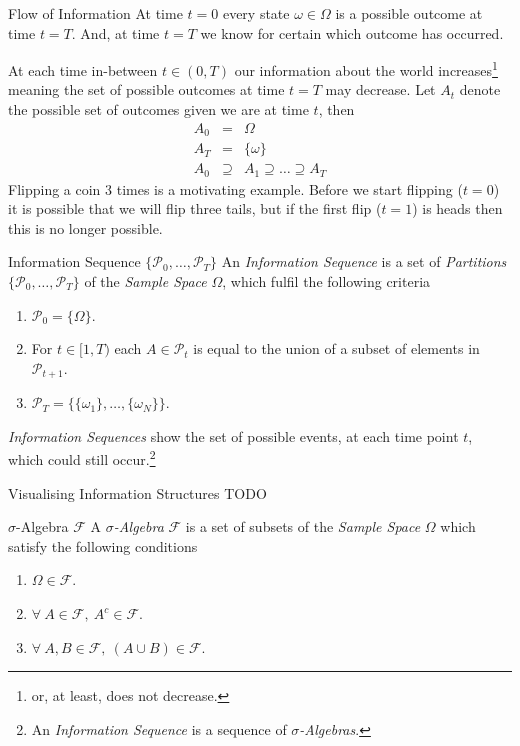 \documentclass[11pt,a4paper]{article}
\begin{document}
  \begin{remark}{Flow of Information}
    At time $t=0$ every state $\omega\in\Omega$ is a possible outcome at time $t=T$. And, at time $t=T$ we know for certain which outcome has occurred.
    \par At each time in-between $t\in(0,T)$ our information about the world increases\footnote{or, at least, does not decrease.} meaning the set of possible outcomes at time $t=T$ may decrease. Let $A_t$ denote the possible set of outcomes given we are at time $t$, then
    \[\begin{array}{rcl}
      A_0&=&\Omega\\
      A_T&=&\{\omega\}\\
      A_0&\supseteq&A_1\supseteq\dots\supseteq A_T
    \end{array}\]
    Flipping a coin 3 times is a motivating example. Before we start flipping ($t=0$) it is possible that we will flip three tails, but if the first flip ($t=1$) is heads then this is no longer possible.
  \end{remark}

  \begin{definition}{Information Sequence $\{\mathcal{P}_0,\dots,\mathcal{P}_T\}$}
    An \textit{Information Sequence} is a set of \textit{Partitions} $\{\mathcal{P}_0,\dots,\mathcal{P}_T\}$ of the \textit{Sample Space} $\Omega$, which fulfil the following criteria
    \begin{enumerate}
      \item $\mathcal{P}_0=\big\{\Omega\big\}$.
      \item For $t\in[1,T)$ each $A\in\mathcal{P}_t$ is equal to the union of a subset of elements in $\mathcal{P}_{t+1}$.
      \item $\mathcal{P}_T=\big\{\{\omega_1\},\dots,\{\omega_N\}\big\}$.
    \end{enumerate}
    \textit{Information Sequences} show the set of possible events, at each time point $t$, which could still occur.\footnote{An \textit{Information Sequence} is a sequence of \textit{$\sigma$-Algebras}.}
  \end{definition}

  \begin{remark}{Visualising Information Structures}
    TODO
  \end{remark}

  \begin{definition}{$\sigma$-Algebra $\mathcal{F}$}
    A \textit{$\sigma$-Algebra} $\mathcal{F}$ is a set of subsets of the \textit{Sample Space} $\Omega$ which satisfy the following conditions
    \begin{enumerate}
      \item $\Omega\in\mathcal{F}$.
      \item $\forall\ A\in\mathcal{F},\ A^c\in\mathcal{F}$.
      \item $\forall\ A,B\in\mathcal{F},\ (A\cup B)\in\mathcal{F}$.
    \end{enumerate}
  \end{definition}
\end{document}
